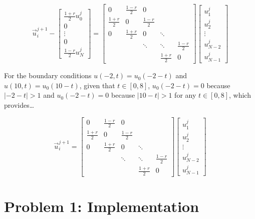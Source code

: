 \documentclass[12pt,letterpaper]{article}
\begin{document}
\begin{equation*}
    \overrightarrow{u}^{j+1}_{i} - \begin{bmatrix} \frac{1+r}{2}u^{j}_{0} \\ 0 \\ \vdots \\ 0 \\ \frac{1-r}{2}u^{j}_{N} \end{bmatrix} = \begin{bmatrix} 0 & \frac{1-r}{2} & 0 & \\ \frac{1+r}{2} & 0 & \frac{1-r}{2} & & \\ 0 & \frac{1+r}{2} & 0 & \ddots & \\ & & \ddots & \ddots & \frac{1-r}{2} \\  & & & \frac{1+r}{2} & 0 \end{bmatrix} \begin{bmatrix} u^{j}_{1} \\ u^{j}_{2} \\ \vdots \\ u^{j}_{N-2} \\ u^{j}_{N-1} \end{bmatrix}
\end{equation*}

For the boundary conditions\: $u(-2,t)=u_0 (-2-t)$ and $u(10,t)=u_0 (10-t)$, given that $t \in [0,8]$, $u_0(-2-t) = 0$ because $|-2-t| > 1$ and $u_0(-2-t) = 0$ because $|10-t| > 1$ for any $t \in [0,8]$, which provides\ldots

\begin{equation*}
    \overrightarrow{u}^{j+1}_{i} = \begin{bmatrix} 0 & \frac{1-r}{2} & 0 & \\ \frac{1+r}{2} & 0 & \frac{1-r}{2} & & \\ 0 & \frac{1+r}{2} & 0 & \ddots & \\ & & \ddots & \ddots & \frac{1-r}{2} \\  & & & \frac{1+r}{2} & 0 \end{bmatrix} \begin{bmatrix} u^{j}_{1} \\ u^{j}_{2} \\ \vdots \\ u^{j}_{N-2} \\ u^{j}_{N-1} \end{bmatrix}
\end{equation*}

\section*{Problem 1: Implementation}
\end{document}
